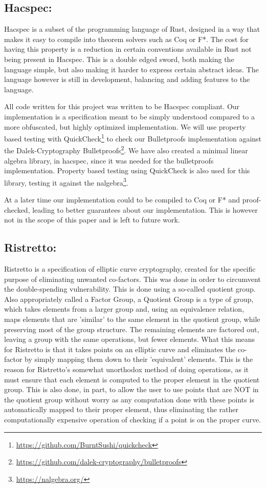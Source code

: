\documentclass{article}
\begin{document}
\subsection{Hacspec:} \label{Hacspec}

Hacspec is a subset of the programming language of Rust, designed in a
way that makes it easy to compile into theorem solvers such as Coq or F*.
The cost for having this property is a reduction in certain conventions
available in Rust not being present in Hacspec. This is a double edged
sword, both making the language simple, but also making it harder to
express certain abstract ideas. The language however is still in
development, balancing and adding features to the language.

All code written for this project was written to be Hacspec
compliant.  Our implementation is a specification meant to
be simply understood compared to a more obfuscated, but highly
optimized implementation. We will use property based testing with
QuickCheck\footnote{\url{https://github.com/BurntSushi/quickcheck}}
to check our Bulletproofs implementation against the Dalek-Cryptography
Bulletproofs\footnote{\url{https://github.com/dalek-cryptography/bulletproofs}}.
We have also created a minimal linear algebra library, in hacspec,
since it was needed for the bulletproofs implementation. Property
based testing using QuickCheck is also used for this library, testing
it against the nalgebra\footnote{\url{https://nalgebra.org/}}.

At a later time our implementation could to be compiled to Coq or F* and
proof-checked, leading to better guarantees about our implementation.
This is however not in the scope of this paper and is left to future
work. %

\subsection{Ristretto:} \label{ristretto}

Ristretto is a specification of elliptic curve cryptography, created for
the specific purpose of eliminating unwanted co-factors. This was done
in order to circumvent the double-spending vulnerability. This is done
using a so-called quotient group. Also appropriately called a Factor
Group, a Quotient Group is a type of group, which takes elements from a
larger group and, using an equivalence relation, maps elements that are
'similar' to the same element in the quotient group, while preserving
most of the group structure. The remaining elements are factored out,
leaving a group with the same operations, but fewer elements. What
this means for Ristretto is that it takes points on an elliptic curve
and eliminates the co-factor by simply mapping them down to their
'equivalent' elements. This is the reason for Ristretto's somewhat
unorthodox method of doing operations, as it must ensure that each
element is computed to the proper element in the quotient group. This is
also done, in part, to allow the user to use points that are NOT in the
quotient group without worry as any computation done with these points
is automatically mapped to their proper element, thus eliminating the
rather computationally expensive operation of checking if a point is
on the proper curve.
\end{document}
